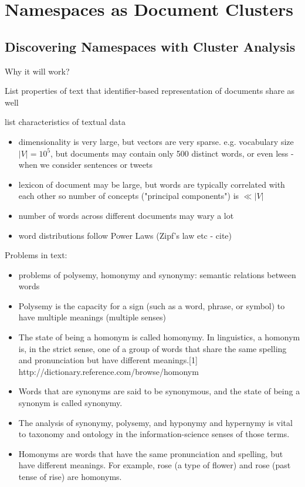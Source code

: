 \section{Namespaces as Document Clusters}
\subsection{Discovering Namespaces with Cluster Analysis}

Why it will work?

List properties of text that identifier-based representation of documents share as well

list characteristics of textual data



\begin{itemize}
  \item dimensionality is very large, but vectors are very sparse.
    e.g. vocabulary size $| V | = 10^5$, but documents may contain only 500 distinct words,
    or even less - when we consider sentences or tweets
  \item lexicon of document may be large, but words are typically correlated with each other
    so number of concepts ("principal components") is $\ll | V |$
  \item number of words across different documents may wary a lot
  \item word distributions follow Power Laws (Zipf's law etc - cite)
\end{itemize}

Problems in text:

\begin{itemize}
  \item problems of polysemy, homonymy and synonymy: semantic relations between words
  \item Polysemy is the capacity for a sign (such as a word, phrase, or symbol) to have multiple meanings (multiple senses)
  \item The state of being a homonym is called homonymy. In linguistics, a homonym is, in the strict sense, one of a group of words that share the same spelling and pronunciation but have different meanings.[1] http://dictionary.reference.com/browse/homonym
  \item Words that are synonyms are said to be synonymous, and the state of being a synonym is called synonymy.
  \item The analysis of synonymy, polysemy, and hyponymy and hypernymy is vital to taxonomy and ontology in the information-science senses of those terms.
  \item Homonyms are words that have the same pronunciation and spelling, but have different meanings. For example, rose (a type of flower) and rose (past tense of rise) are homonyms.
\end{itemize}

